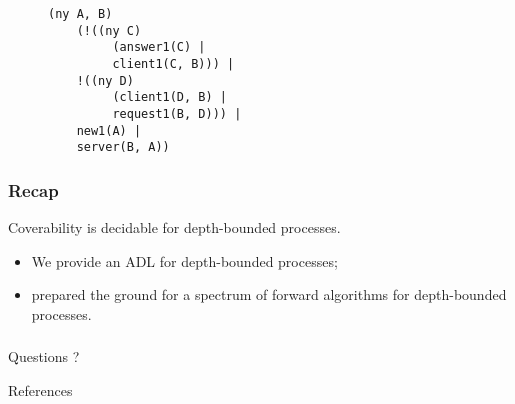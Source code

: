 \documentclass{beamer}
\begin{document}
\begin{frame}[fragile]
\begin{figure}
\begin{minipage}{0.35\linewidth}
{\begin{verbatim}
(ny A, B)
    (!((ny C)
         (answer1(C) |
         client1(C, B))) |
    !((ny D)
         (client1(D, B) |
         request1(B, D))) |
    new1(A) |
    server(B, A))
\end{verbatim}
}
\end{minipage}
\end{figure}

\end{frame} 


\begin{frame} 
  \frametitle{Recap}
  \begin{center}
    Coverability is decidable for depth-bounded processes.
  \end{center}
  \begin{itemize}
  \item We provide an ADL for depth-bounded processes;
  \item prepared the ground for a spectrum of forward algorithms for depth-bounded processes.
  \end{itemize}
\end{frame} 

\begin{frame} 
  \frametitle{}
  \begin{center}
  {\Large Questions ?}
  \end{center}
\end{frame} 

\begin{frame}[allowframebreaks]{References}
  \frametitle{}
  {\tiny
  
  
  }
\end{frame}
\end{document}
